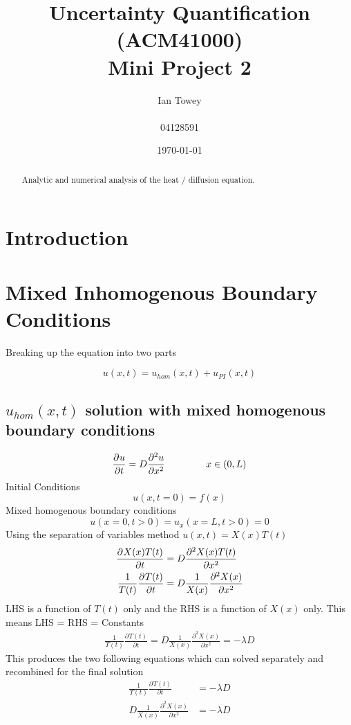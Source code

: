 \documentclass[a4paper]{article}
\title{Uncertainty Quantification (ACM41000) \\ Mini Project 2}
\author{Ian Towey \\ \\ 04128591}
\date{\today}
\newcommand*{\pd}[3][]{\ensuremath{\frac{\partial^{#1} #2}{\partial #3}}}
\begin{document}
  \maketitle

  \begin{abstract}
    Analytic and numerical analysis of the heat / diffusion equation.
  \end{abstract}

\tableofcontents
\newpage

\section{Introduction}
\label{sec:introduction}	

\section{Mixed Inhomogenous Boundary Conditions}
Breaking up the equation into two parts

\begin{equation}
u(x,t) = u_{hom}(x,t) + u_{PI}(x,t) 
\end{equation}
\subsection{$u_{hom}(x,t)$ solution with mixed homogenous boundary conditions}

\begin{equation}
\pd{u}{t}=D\pd[2]{u}{x^2} \hspace{15mm} x \in (0, L)
\end{equation}
Initial Conditions 
\begin{equation}
u(x,t = 0) = f(x) 
\end{equation}
Mixed homogenous boundary conditions
\begin{equation}
u(x = 0, t > 0) = u_{x}(x = L, t > 0) = 0
\end{equation}
Using the separation of variables method $u(x, t) = X(x)T(t)$
\begin{align*}
\pd{X(x)T(t)}{t} &= D\pd[2]{X(x)T(t)}{x^2} \\
\vspace{15mm}
\frac{1}{T(t)}\pd{T(t)}{t} &= D\frac{1}{X(x)}\pd[2]{X(x)}{x^2}
\end{align*}
LHS is a function of $T(t)$ only and the RHS is a function of $X(x)$ only. This means LHS = RHS = Constants 
\begin{align*}
\frac{1}{T(t)}\pd{T(t)}{t} = D\frac{1}{X(x)}\pd[2]{X(x)}{x^2} = -\lambda D 
\end{align*}
This produces the two following equations which can solved separately and recombined for the final solution
\begin{align}
\frac{1}{T(t)}\pd{T(t)}{t} &= -\lambda D \\
D \frac{1}{X(x)}\pd[2]{X(x)}{x^2} &= -\lambda D 
\end{align}
\end{document}
